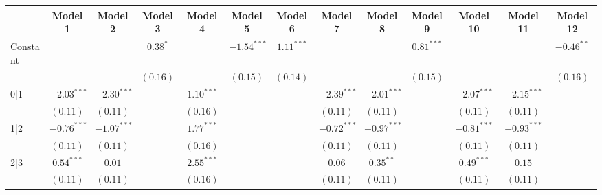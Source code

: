 
\usepackage{booktabs}
\usepackage{threeparttable}

\begin{table}
\begin{center}
\begin{threeparttable}
\begin{tabular}{l c c c c c c c c c c c c}
\toprule
 & Model 1 & Model 2 & Model 3 & Model 4 & Model 5 & Model 6 & Model 7 & Model 8 & Model 9 & Model 10 & Model 11 & Model 12 \\
\midrule
Constant                        &               &               & $0.38^{*}$    &              & $-1.54^{***}$ & $1.11^{***}$  &               &               & $0.81^{***}$  &               &               & $-0.46^{**}$  \\
                                &               &               & $(0.16)$      &              & $(0.15)$      & $(0.14)$      &               &               & $(0.15)$      &               &               & $(0.16)$      \\
0|1                             & $-2.03^{***}$ & $-2.30^{***}$ &               & $1.10^{***}$ &               &               & $-2.39^{***}$ & $-2.01^{***}$ &               & $-2.07^{***}$ & $-2.15^{***}$ &               \\
                                & $(0.11)$      & $(0.11)$      &               & $(0.16)$     &               &               & $(0.11)$      & $(0.11)$      &               & $(0.11)$      & $(0.11)$      &               \\
1|2                             & $-0.76^{***}$ & $-1.07^{***}$ &               & $1.77^{***}$ &               &               & $-0.72^{***}$ & $-0.97^{***}$ &               & $-0.81^{***}$ & $-0.93^{***}$ &               \\
                                & $(0.11)$      & $(0.11)$      &               & $(0.16)$     &               &               & $(0.11)$      & $(0.11)$      &               & $(0.11)$      & $(0.11)$      &               \\
2|3                             & $0.54^{***}$  & $0.01$        &               & $2.55^{***}$ &               &               & $0.06$        & $0.35^{**}$   &               & $0.49^{***}$  & $0.15$        &               \\
                                & $(0.11)$      & $(0.11)$      &               & $(0.16)$     &               &               & $(0.11)$      & $(0.11)$      &               & $(0.11)$      & $(0.11)$      &               \\

\end{tabular}
\end{threeparttable}
\end{center}
\end{table}
